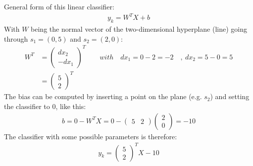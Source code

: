 \documentclass[11pt]{article}
\newcommand{\exercise}{\section{}}
\begin{document}
\exercise
\begin{center}
\end{center}
General form of this linear classifier:
\begin{align*}
	y_k = W^T X + b
\end{align*}
With $W$ being the normal vector of the two-dimensional hyperplane (line) going through $s_1=(0,5)$ and $s_2=(2,0)$:
\begin{align*}
	W^T &= 
	\begin{pmatrix}
	dx_2\\-dx_1
	\end{pmatrix}^T
	\quad\quad with\quad dx_1 = 0 - 2 = -2\quad,\ dx_2= 5-0 = 5\\
	&= 
	\begin{pmatrix}
	5\\2
	\end{pmatrix}^T
\end{align*}
The bias can be computed by inserting a point on the plane (e.g. $s_2$) and setting the classifier to $0$, like this:
\begin{align*}
	b = 0 - W^T X = 0 - 
	\begin{pmatrix}
	5 & 2
	\end{pmatrix}
	\begin{pmatrix}
	2\\0
	\end{pmatrix}
	= -10
\end{align*}
The classifier with some possible parameters is therefore:
\begin{align*}
	y_k = 
	\begin{pmatrix}
	5\\2
	\end{pmatrix}^T 
	X - 10
\end{align*}
\end{document}
